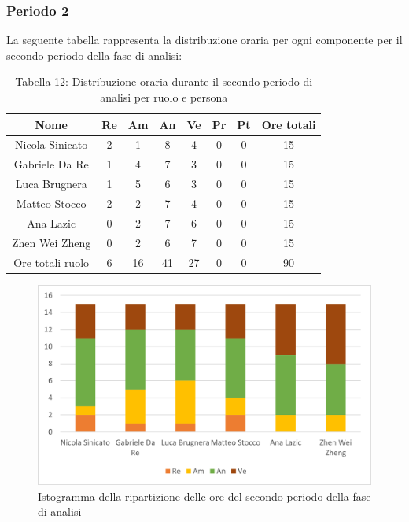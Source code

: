 \subsubsection{Periodo 2}
%
La seguente tabella rappresenta la distribuzione oraria per ogni componente per il secondo periodo della fase di analisi:
\begin{table}[h]
	\setlength\extrarowheight{5pt}
	\centering
	\begin{tabularx}{\textwidth}{|ccccccc|c|}
		\hline
		\rowcolor{white}
		\textbf{Nome} & \textbf{Re} & \textbf{Am} & \textbf{An} & \textbf{Ve} & \textbf{Pr}& \textbf{Pt} & \textbf{Ore totali} \\
		\hline
		Nicola Sinicato &2&1&8&4&0&0&15 \\
		Gabriele Da Re &1&4&7&3&0&0&15 \\
		Luca Brugnera &1&5&6&3&0&0&15 \\
		Matteo Stocco &2&2&7&4&0&0&15 \\
		Ana Lazic &0&2&7&6&0&0&15 \\
		Zhen Wei Zheng &0&2&6&7&0&0&15 \\
		\hline
		Ore totali ruolo &6&16&41&27&0&0&90 \\
		\hline
	\end{tabularx}
	\vspace{10pt}
	\caption{Tabella 12: Distribuzione oraria durante il secondo periodo di analisi per ruolo e persona}
\end{table}
\begin{figure}[H]
    \centering
    \includegraphics[scale=0.6]{img/grafi preventivo/istogrammi/analisi/periodo2.png}
    \caption{Istogramma della ripartizione delle ore del secondo periodo della fase di analisi}
\end{figure}
